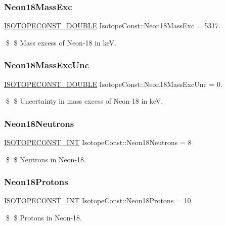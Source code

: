 \subsubsection{\texorpdfstring{Neon18\+Mass\+Exc}{Neon18MassExc}}
{\footnotesize\ttfamily \mbox{\hyperlink{group___isotope_const-_macros_ga8f45a7272ce02c0b4c65c44636ed719a}{I\+S\+O\+T\+O\+P\+E\+C\+O\+N\+S\+T\+\_\+\+D\+O\+U\+B\+LE}} Isotope\+Const\+::\+Neon18\+Mass\+Exc = 5317.}

\$ \$ Mass excess of Neon-\/18 in keV. \mbox{\label{group___isotope_const-_neon-_ne18_ga168e22e95234527bb9de10776d0d8c11}} 
\subsubsection{\texorpdfstring{Neon18\+Mass\+Exc\+Unc}{Neon18MassExcUnc}}
{\footnotesize\ttfamily \mbox{\hyperlink{group___isotope_const-_macros_ga8f45a7272ce02c0b4c65c44636ed719a}{I\+S\+O\+T\+O\+P\+E\+C\+O\+N\+S\+T\+\_\+\+D\+O\+U\+B\+LE}} Isotope\+Const\+::\+Neon18\+Mass\+Exc\+Unc = 0.}

\$ \$ Uncertainty in mass excess of Neon-\/18 in keV. \mbox{\label{group___isotope_const-_neon-_ne18_ga4aa5568e5573962f5832ccab0c94bb0f}} 
\subsubsection{\texorpdfstring{Neon18\+Neutrons}{Neon18Neutrons}}
{\footnotesize\ttfamily \mbox{\hyperlink{group___isotope_const-_macros_ga5f18360b3e99483a35c32d789e62621c}{I\+S\+O\+T\+O\+P\+E\+C\+O\+N\+S\+T\+\_\+\+I\+NT}} Isotope\+Const\+::\+Neon18\+Neutrons = 8}

\$ \$ Neutrons in Neon-\/18. \mbox{\label{group___isotope_const-_neon-_ne18_ga6e067121c43aeee00e7f81afe2546ad5}} 
\subsubsection{\texorpdfstring{Neon18\+Protons}{Neon18Protons}}
{\footnotesize\ttfamily \mbox{\hyperlink{group___isotope_const-_macros_ga5f18360b3e99483a35c32d789e62621c}{I\+S\+O\+T\+O\+P\+E\+C\+O\+N\+S\+T\+\_\+\+I\+NT}} Isotope\+Const\+::\+Neon18\+Protons = 10}

\$ \$ Protons in Neon-\/18. 